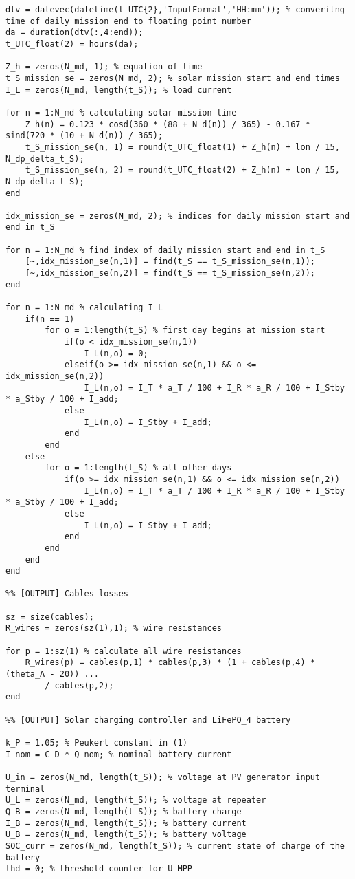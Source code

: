 \begin{lstlisting}
dtv = datevec(datetime(t_UTC{2},'InputFormat','HH:mm')); % converitng time of daily mission end to floating point number
da = duration(dtv(:,4:end));
t_UTC_float(2) = hours(da);

Z_h = zeros(N_md, 1); % equation of time 
t_S_mission_se = zeros(N_md, 2); % solar mission start and end times
I_L = zeros(N_md, length(t_S)); % load current

for n = 1:N_md % calculating solar mission time
    Z_h(n) = 0.123 * cosd(360 * (88 + N_d(n)) / 365) - 0.167 * sind(720 * (10 + N_d(n)) / 365);
    t_S_mission_se(n, 1) = round(t_UTC_float(1) + Z_h(n) + lon / 15, N_dp_delta_t_S);
    t_S_mission_se(n, 2) = round(t_UTC_float(2) + Z_h(n) + lon / 15, N_dp_delta_t_S);
end

idx_mission_se = zeros(N_md, 2); % indices for daily mission start and end in t_S

for n = 1:N_md % find index of daily mission start and end in t_S
    [~,idx_mission_se(n,1)] = find(t_S == t_S_mission_se(n,1));
    [~,idx_mission_se(n,2)] = find(t_S == t_S_mission_se(n,2)); 
end

for n = 1:N_md % calculating I_L
    if(n == 1)
        for o = 1:length(t_S) % first day begins at mission start
            if(o < idx_mission_se(n,1))
                I_L(n,o) = 0;
            elseif(o >= idx_mission_se(n,1) && o <= idx_mission_se(n,2))
                I_L(n,o) = I_T * a_T / 100 + I_R * a_R / 100 + I_Stby * a_Stby / 100 + I_add;
            else
                I_L(n,o) = I_Stby + I_add;
            end
        end
    else
        for o = 1:length(t_S) % all other days
            if(o >= idx_mission_se(n,1) && o <= idx_mission_se(n,2))
                I_L(n,o) = I_T * a_T / 100 + I_R * a_R / 100 + I_Stby * a_Stby / 100 + I_add;
            else
                I_L(n,o) = I_Stby + I_add;
            end
        end
    end    
end

%% [OUTPUT] Cables losses

sz = size(cables);
R_wires = zeros(sz(1),1); % wire resistances

for p = 1:sz(1) % calculate all wire resistances
    R_wires(p) = cables(p,1) * cables(p,3) * (1 + cables(p,4) * (theta_A - 20)) ... 
        / cables(p,2);
end

%% [OUTPUT] Solar charging controller and LiFePO_4 battery

k_P = 1.05; % Peukert constant in (1)
I_nom = C_D * Q_nom; % nominal battery current

U_in = zeros(N_md, length(t_S)); % voltage at PV generator input terminal
U_L = zeros(N_md, length(t_S)); % voltage at repeater
Q_B = zeros(N_md, length(t_S)); % battery charge
I_B = zeros(N_md, length(t_S)); % battery current
U_B = zeros(N_md, length(t_S)); % battery voltage
SOC_curr = zeros(N_md, length(t_S)); % current state of charge of the battery
thd = 0; % threshold counter for U_MPP


\end{lstlisting}
